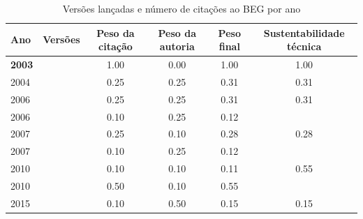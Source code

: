 \begin{table}[H]
\caption{Versões lançadas e número de citações ao BEG por ano}
\centering
\begin{tabular}{| l | c | c | c | c | c |}
  \hline
  Ano & Versões & Peso da citação & Peso da autoria & Peso final & Sustentabilidade técnica \\
  \hline
            {\bf 2003}
          &
          
          &
          1.00
          &
          0.00
          &
          1.00
          &
            {\color{blue} 1.00}
          \\
\hline
            2004
          &
          
          &
          0.25
          &
          0.25
          &
          0.31
          &
            {\color{red} 0.31}
          \\
\hline
            2006
          &
          
          &
          0.25
          &
          0.25
          &
          0.31
          &
            {\color{red} 0.31}
          \\
            2006
          &
          
          &
          0.10
          &
          0.25
          &
          0.12
          &
          \\
\hline
            2007
          &
          
          &
          0.25
          &
          0.10
          &
          0.28
          &
            {\color{red} 0.28}
          \\
            2007
          &
          
          &
          0.10
          &
          0.25
          &
          0.12
          &
          \\
\hline
            2010
          &
          
          &
          0.10
          &
          0.10
          &
          0.11
          &
            {\color{blue} 0.55}
          \\
            2010
          &
          
          &
          0.50
          &
          0.10
          &
          0.55
          &
          \\
\hline
            2015
          &
          
          &
          0.10
          &
          0.50
          &
          0.15
          &
            {\color{red} 0.15}
          \\
\hline
\end{tabular}
\end{table}

